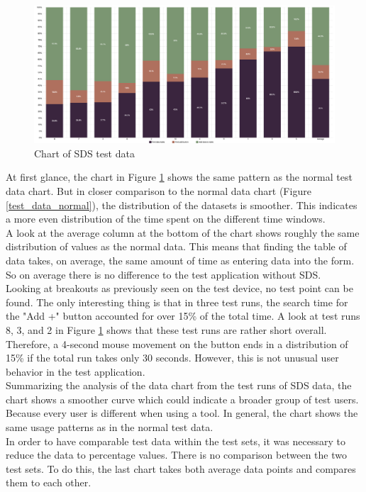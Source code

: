 \begin{figure}[htbp]
    \centerline{
    \includegraphics[width=\linewidth]{images/sds_test_data_chart.png}}
\caption{Chart of \ac{SDS} test data}
\label{test_data_sds}
\end{figure}
At first glance, the chart in Figure \ref{test_data_sds} shows the same pattern as the normal test data chart. But in closer comparison to the normal data chart (Figure \ref{test_data_normal}), the distribution of the datasets is smoother. This indicates a more even distribution of the time spent on the different time windows. \\
A look at the average column at the bottom of the chart shows roughly the same distribution of values as the normal data. This means that finding the table of data takes, on average, the same amount of time as entering data into the form. So on average there is no difference to the test application without \ac{SDS}. \\
Looking at breakouts as previously seen on the test device, no test point can be found. The only interesting thing is that in three test runs, the search time for the "Add +" button accounted for over 15\% of the total time. A look at test runs 8, 3, and 2 in Figure \ref{test_data_sds} shows that these test runs are rather short overall. Therefore, a 4-second mouse movement on the button ends in a distribution of 15\% if the total run takes only 30 seconds. However, this is not unusual user behavior in the test application.\\
Summarizing the analysis of the data chart from the test runs of SDS data, the chart shows a smoother curve which could indicate a broader group of test users. Because every user is different when using a tool. In general, the chart shows the same usage patterns as in the normal test data. \\

In order to have comparable test data within the test sets, it was necessary to reduce the data to percentage values. There is no comparison between the two test sets. To do this, the last chart takes both average data points and compares them to each other. \\

